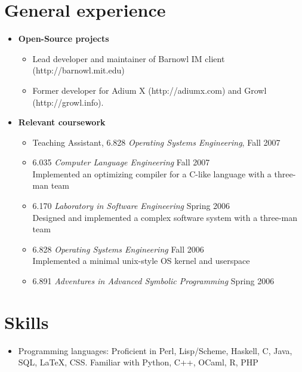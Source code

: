 \documentclass[letterpaper,10pt]{article}
\begin{document}
\section*{General experience}
\vspace*{-0.2cm}
\begin{itemize}
  \item \textbf{Open-Source projects} \\
    \vspace*{-0.5cm}
    \begin{itemize}
      \item Lead developer and maintainer of Barnowl IM client
        (http://barnowl.mit.edu)
      \item Former developer for Adium X (http://adiumx.com) and Growl
        (http://growl.info).
    \end{itemize}

  \item \textbf{Relevant coursework}
  \begin{itemize}
      \item Teaching Assistant, 6.828 {\em Operating Systems Engineering}, Fall 2007
      \item 6.035 {\em Computer Language Engineering} Fall 2007 \\
        Implemented an optimizing compiler for a C-like language with a three-man team
      \item 6.170 {\em Laboratory in Software Engineering} Spring 2006 \\
        Designed and implemented a complex software system with a three-man team
      \item 6.828 {\em Operating Systems Engineering} Fall 2006 \\
        Implemented a minimal unix-style OS kernel and userspace
      \item 6.891 {\em Adventures in Advanced Symbolic Programming} Spring 2006
  \end{itemize}
\end{itemize}

\section*{Skills}
\vspace*{-0.2cm}
\begin{itemize}
  \item Programming languages: Proficient in Perl, Lisp/Scheme, Haskell,
    C, Java, SQL, \LaTeX, CSS. Familiar with Python, C++, OCaml, R, PHP

\end{itemize}
\end{document}

